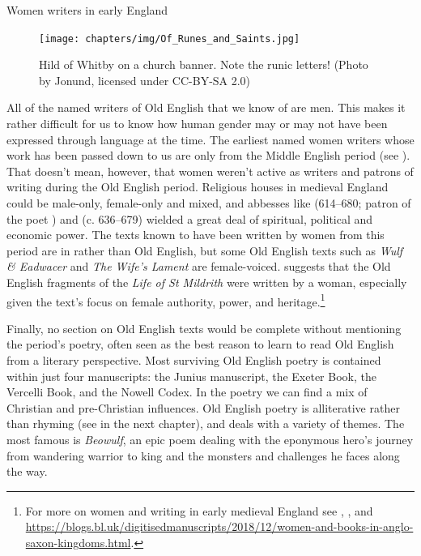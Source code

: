 \begin{peoplebox}{Women writers in early England}
\begin{figure}
    \centering
    \texttt{[image: chapters/img/Of\_Runes\_and\_Saints.jpg]}
    \caption{Hild of Whitby on a church banner. Note the runic letters! (Photo by Jonund, licensed under CC-BY-SA 2.0)}
    \label{fig:OE_Hild}
\end{figure}

All of the named writers of Old English that we know of are men. This makes it rather difficult for us to know how human gender may or may not have been expressed through language at the time. The earliest named women writers whose work has been passed down to us are only from the Middle English period (see ). That doesn't mean, however, that women weren't active as writers and patrons of writing during the Old English period. Religious houses in medieval England could be male-only, female-only and mixed, and abbesses like  (614--680; patron of the poet ) and  (c. 636--679) wielded a great deal of spiritual, political and economic power. The texts known to have been written by women from this period are in  rather than Old English, but some Old English texts such as \textit{Wulf \& Eadwacer} and \textit{The Wife's Lament} are female-voiced. \citet[58--68]{Watt2019} suggests that the Old English fragments of the \textit{Life of St Mildrith} were written by a woman, especially given the text's focus on female authority, power, and heritage.\footnote{For more on women and writing in early medieval England see \citet{LeesOvering2001}, \citet{Watt2019}, and \url{https://blogs.bl.uk/digitisedmanuscripts/2018/12/women-and-books-in-anglo-saxon-kingdoms.html}.}
\end{peoplebox}


\noindent Finally, no section on Old English texts would be complete without mentioning the period's poetry, often seen as the best reason to learn to read Old English from a literary perspective. Most surviving Old English poetry is contained within just four manuscripts: the Junius manuscript, the Exeter Book, the Vercelli Book, and the Nowell Codex. In the poetry we can find a mix of Christian and pre-Christian influences. Old English poetry is alliterative rather than rhyming (see  in the next chapter), and deals with a variety of themes. The most famous is \emph{Beowulf}, an epic poem dealing with the eponymous hero's journey from wandering warrior to king and the monsters and challenges he faces along the way.

